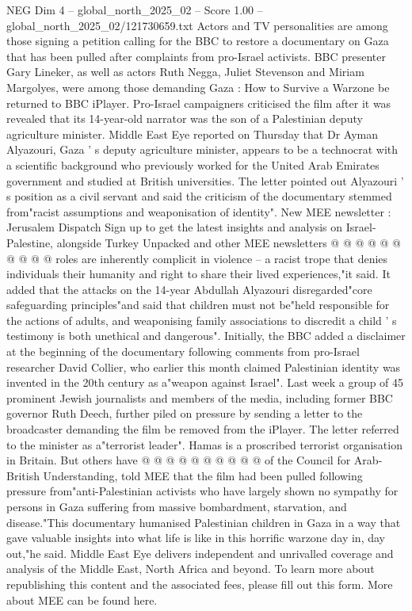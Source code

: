 \begin{textsample}{NEG Dim 4 – global\_north\_2025\_02 – Score 1.00 – global\_north\_2025\_02/121730659.txt}  \label{ex:f4_neg_402}
Actors and TV personalities are among those signing a petition calling for the BBC to restore a documentary on Gaza that has been pulled after complaints from pro-Israel activists.
BBC presenter Gary Lineker, as well as actors Ruth Negga, Juliet Stevenson and Miriam Margolyes, were among those demanding Gaza : How to Survive a Warzone be returned to BBC iPlayer.
Pro-Israel campaigners criticised the film after it was revealed that its 14-year-old narrator was the son of a Palestinian deputy agriculture minister.
Middle East Eye reported on Thursday that Dr Ayman Alyazouri, Gaza ' s deputy agriculture minister, appears to be a technocrat with a scientific background who previously worked for the United Arab Emirates government and studied at British universities.
The letter pointed out Alyazouri ' s position as a civil servant and said the criticism of the documentary stemmed from"racist assumptions and weaponisation of identity".
New MEE newsletter : Jerusalem Dispatch Sign up to get the latest insights and analysis on Israel-Palestine, alongside Turkey Unpacked and other MEE newsletters @ @ @ @ @ @ @ @ @ @ roles are inherently complicit in violence -- a racist trope that denies individuals their humanity and right to share their lived experiences,"it said.
It added that the attacks on the 14-year Abdullah Alyazouri disregarded"core safeguarding principles"and said that children must not be"held responsible for the actions of adults, and weaponising family associations to discredit a child ' s testimony is both unethical and dangerous".
Initially, the BBC added a disclaimer at the beginning of the documentary following comments from pro-Israel researcher David Collier, who earlier this month claimed Palestinian identity was invented in the 20th century as a"weapon against Israel".
Last week a group of 45 prominent Jewish journalists and members of the media, including former BBC governor Ruth Deech, further piled on pressure by sending a letter to the broadcaster demanding the film be removed from the iPlayer.
The letter referred to the minister as a"terrorist leader".
Hamas is a proscribed terrorist organisation in Britain.
But others have @ @ @ @ @ @ @ @ @ @ of the Council for Arab-British Understanding, told MEE that the film had been pulled following pressure from"anti-Palestinian activists who have largely shown no sympathy for persons in Gaza suffering from massive bombardment, starvation, and disease."This documentary humanised Palestinian children in Gaza in a way that gave valuable insights into what life is like in this horrific warzone day in, day out,"he said.
Middle East Eye delivers independent and unrivalled coverage and analysis of the Middle East, North Africa and beyond.
To learn more about republishing this content and the associated fees, please fill out this form.
More about MEE can be found here.

\end{textsample}
